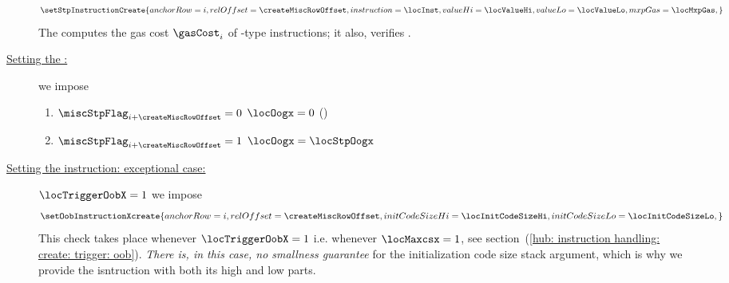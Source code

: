 \begin{description}
		\[
			\setStpInstructionCreate
			{
				anchorRow   = i,
				relOffset   = \createMiscRowOffset,
				instruction = \locInst,
				valueHi     = \locValueHi,
				valueLo     = \locValueLo,
				mxpGas      = \locMxpGas,
			}
		\]
		\saNote{} The \stpMod{} computes the gas cost $\gasCost_{i}$ of -type instructions; it also, verifies \locOogx{}.
	\item[\underline{Setting the \oogxSH{}:}]
		we impose
		\begin{enumerate}
			\item \If $\miscStpFlag_{i + \createMiscRowOffset} = 0$ \Then $\locOogx = 0$ \quad (\trash)
			\item \If $\miscStpFlag_{i + \createMiscRowOffset} = 1$ \Then $\locOogx = \locStpOogx$
		\end{enumerate}
	\item[\underline{Setting the \oobMod{} instruction: exceptional case:}]
		\If $\locTriggerOobX = 1$ \Then
		we impose
		\[
			\setOobInstructionXcreate {
				anchorRow      = i                    ,
				relOffset      = \createMiscRowOffset ,
				initCodeSizeHi = \locInitCodeSizeHi   ,
				initCodeSizeLo = \locInitCodeSizeLo   ,
			}
		\]
		\saNote{}
		This check takes place
		whenever $\locTriggerOobX = 1$ i.e.
		whenever $\locMaxcsx      = 1$,
		see section~(\ref{hub: instruction handling: create: trigger: oob}).
		\emph{There is, in this case, no smallness guarantee} for the initialization code size stack argument,
		which is why we provide the \oobMod{} isntruction with both its high and low parts.



\end{description}
